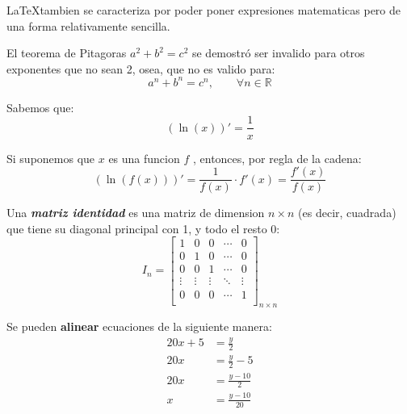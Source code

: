\documentclass[12pt]{article}
\begin{document}
    \LaTeX tambien se caracteriza por poder poner expresiones matematicas
    pero de una forma relativamente sencilla.

    El teorema de Pitagoras \( a^2 + b^2 = c^2 \) se demostró ser invalido para otros
    exponentes que no sean 2, osea, que no es valido para:
    \[ a^n + b^n = c^n, \qquad \forall n \in \mathbb{R} \]

    Sabemos que:
    \[ ( \ln(x) )' = \frac{1}{x} \]

    Si suponemos que \(x\) es una funcion \(f\) , entonces, por regla de la cadena:
    \[ ( \ln( f(x) ) )' = \frac{1}{ f(x) } \cdot f'(x) = \frac{ f'(x) }{ f(x) } \]

    Una \textbf{\textit{matriz identidad}} es una matriz de dimension \(n \times n\) (es decir,
    cuadrada) que tiene su diagonal principal con 1, y todo el resto 0:
    \[
        I_n =
        \left[\begin{matrix}
            1      & 0      & 0      & \cdots & 0      \\
            0      & 1      & 0      & \cdots & 0      \\
            0      & 0      & 1      & \cdots & 0      \\
            \vdots & \vdots & \vdots & \ddots & \vdots \\
            0      & 0      & 0      & \cdots & 1      \\
        \end{matrix}\right]_{n \times n}
    \]

    Se pueden \textbf{alinear} ecuaciones de la siguiente manera:
    \begin{align*}
        20x + 5 &= \frac{y}{2} \\
        20x &= \frac{y}{2} - 5 \\
        20x &= \frac{y - 10}{2} \\
        x &= \frac{y - 10}{20}
    \end{align*}
\end{document}
